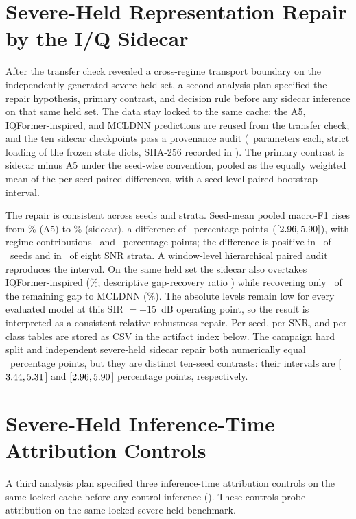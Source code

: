 \documentclass[letterpaper,onecolumn,11pt,journal]{IEEEtran}
\newcommand{\pp}{percentage points}
\begin{document}
\section{Severe-Held Representation Repair by the
I/Q Sidecar}
After the transfer check revealed a cross-regime transport boundary on the
independently generated severe-held set, a second analysis plan specified the
repair hypothesis, primary contrast, and decision
rule before any sidecar inference on that same held set. The data stay locked
to the same cache; the A5, IQFormer-inspired, and MCLDNN predictions are
reused from the transfer check; and the ten sidecar checkpoints pass a
provenance audit (\SidecarParameters\ parameters each, strict loading of the
frozen state dicts, SHA-256 recorded in
). The primary contrast is sidecar
minus A5 under the seed-wise convention, pooled as the equally weighted mean
of the per-seed paired differences, with a seed-level paired bootstrap
interval.

The repair is consistent across seeds and strata. Seed-mean pooled macro-F1
rises from \SevereRepairLevelAFive\%
(A5) to \SevereRepairLevelSidecar\% (sidecar), a difference of
\SevereRepairDiff\ \pp\ ($[2.96,5.90]$), with
regime contributions \SevereRepairRegimeOneDiff\ and
\SevereRepairRegimeTwoDiff\ \pp; the difference is positive in
\SevereRepairPositiveSeeds\ of \ProtocolSeedCount\ seeds and in
\SevereRepairPositiveSnrStrata\ of eight SNR strata. A window-level
hierarchical paired audit reproduces the interval. On the same held set the
sidecar also overtakes IQFormer-inspired (\SevereRepairLevelIqformer\%;
descriptive gap-recovery ratio \SevereRepairGapRecoveryIqformer) while
recovering only \SevereRepairGapRecoveryMcldnn\ of the remaining gap to
MCLDNN (\SevereRepairLevelMcldnn\%). The absolute levels remain low for every
evaluated model at this SIR $=-15$~dB operating point, so the result is
interpreted as a consistent relative robustness repair. Per-seed, per-SNR, and
per-class tables are stored as CSV in the artifact index below.
The campaign hard split and independent severe-held sidecar repair both
numerically equal \SevereRepairDiff\ \pp, but they are distinct ten-seed
contrasts: their intervals are [$3.44,5.31$]
and [$2.96,5.90$] \pp, respectively.

\section{Severe-Held Inference-Time Attribution Controls}
\label{sec:controls}
A third analysis plan specified three inference-time attribution controls on the
same locked cache before any control inference
(). These controls probe
attribution on the same locked severe-held benchmark.
\end{document}
